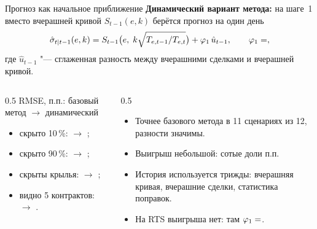 \documentclass[aspectratio=169]{beamer}
\begin{document}
\begin{frame}{Прогноз как начальное приближение}
    \textbf{Динамический вариант метода:} на шаге~1 вместо вчерашней кривой $S_{t-1}(e,k)$ берётся прогноз на один день
    \[
        \hat\sigma_{t|t-1}(e,k)=S_{t-1}\bigl(e,\;k\sqrt{T_{e,t-1}/T_{e,t}}\bigr)+\varphi_1\,\hat u_{t-1},\qquad \varphi_1=\E{Si/phi/1},
    \]
    где $\hat u_{t-1}$ "--- сглаженная разность между вчерашними сделками и вчерашней кривой.
    \medskip
    \begin{columns}[T]
    \begin{column}{0.5\textwidth}
        RMSE, п.п.: базовый метод $\rightarrow$ динамический
        \begin{itemize}
            \item скрыто 10\,\%:  $\rightarrow$ ;
            \item скрыто 90\,\%:  $\rightarrow$ \textbf{};
            \item скрыты крылья:  $\rightarrow$ \textbf{};
            \item видно 5 контрактов:  $\rightarrow$ \textbf{}.
        \end{itemize}
    \end{column}
    \begin{column}{0.5\textwidth}
        \begin{itemize}
            \item Точнее базового метода в 11 сценариях из 12, разности значимы.
            \item Выигрыш небольшой: сотые доли п.п.
            \item История используется трижды: вчерашняя кривая, вчерашние сделки, статистика поправок.
            \item На RTS выигрыша нет: там $\varphi_1=\E{RTS/phi/1}$.
        \end{itemize}
    \end{column}
    \end{columns}
\end{frame}
\end{document}

